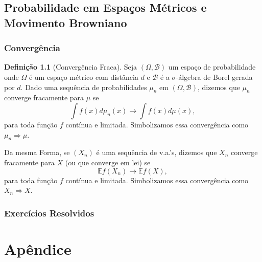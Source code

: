 \documentclass[12pt,a4paper,oneside]{book}
\theoremstyle{definition}
\newtheorem{definition}[theorem]{Defini\c{c}\~ao}
\theoremstyle{remark}
\numberwithin{equation}{section}
\newcommand{\E}{\mathbb{E}}
\begin{document}
\newpage
\chapter{Probabilidade em Espaços Métricos e Movimento Browniano}


\section{Convergência}

\begin{tcolorbox}

\begin{definition}[Convergência Fraca] Seja $(\Omega,\mathcal{B})$ um espaço de probabilidade onde $\Omega$ é um espaço métrico com distância $d$ e $\mathcal{B}$ é a $\sigma$-álgebra de Borel gerada por $d.$ Dado uma sequência de probabilidades $\mu_n$ em $(\Omega,\mathcal{B})$, dizemos que $\mu_n$ converge fracamente para $\mu$ se 
$$\int f(x)d\mu_n(x) \rightarrow \int f(x)d\mu(x), $$
para toda função $f$ contínua e limitada. Simbolizamos essa convergência como 
$\mu_n \Rightarrow \mu. $

Da mesma Forma, se $(X_n)$ é uma sequência de v.a.'s, dizemos que $X_n$ converge fracamente para $X$ (ou que converge em lei) se
$$\E f(X_n)\rightarrow \E f(X), $$
para toda função $f$ contínua e limitada. Simbolizamos essa convergência como 
$X_n \Rightarrow X. $
\end{definition}

\end{tcolorbox}












\newpage
\section{Exercícios Resolvidos}











\part{Apêndice}

\appendix
\chapter{}
\end{document}
